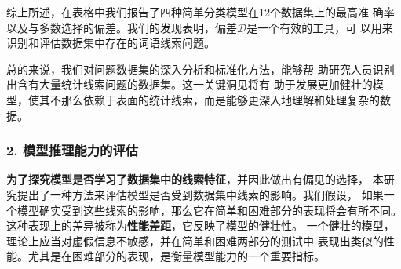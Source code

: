 综上所述，在表格中我们报告了四种简单分类模型在12个数据集上的最高准
确率以及与多数选择的偏差。我们的发现表明，偏差$\mathcal{D}$是一个有效的工具，可
以用来识别和评估数据集中存在的词语线索问题。

总的来说，我们对问题数据集的深入分析和标准化方法，能够帮
助研究人员识别出含有大量统计线索问题的数据集。这一关键洞见将有
助于发展更加健壮的模型，使其不那么依赖于表面的统计线索，而是能够更深入地理解和处理复杂的数据。


\subsubsection*{2. 模型推理能力的评估}

\textbf{为了探究模型是否学习了数据集中的线索特征}，并因此做出有偏见的选择，
本研究提出了一种方法来评估模型是否受到数据集中线索的影响。我们假设，
如果一个模型确实受到这些线索的影响，那么它在简单和困难部分的表现将会有所不同。
这种表现上的差异被称为\textbf{性能差距}，它反映了模型的健壮性。
一个健壮的模型，理论上应当对虚假信息不敏感，并在简单和困难两部分的测试中
表现出类似的性能。尤其是在困难部分的表现，是衡量模型能力的一个重要指标。



